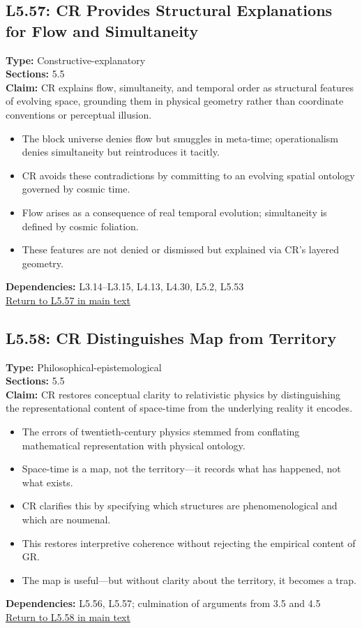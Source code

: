 \documentclass[12pt]{book}
\newcommand{\returnlink}[1]{\hyperref[logic:#1]{Return to #1 in main text}\xspace}
\begin{document}
\subsection*{L5.57: CR Provides Structural Explanations for Flow and Simultaneity}
\label{appendix:L5.57}
\textbf{Type:} Constructive-explanatory \\
\textbf{Sections:} 5.5 \\
\textbf{Claim:} CR explains flow, simultaneity, and temporal order as structural features of evolving space, grounding them in physical geometry rather than coordinate conventions or perceptual illusion.
\begin{itemize}
  \item The block universe denies flow but smuggles in meta-time; operationalism denies simultaneity but reintroduces it tacitly.
  \item CR avoids these contradictions by committing to an evolving spatial ontology governed by cosmic time.
  \item Flow arises as a consequence of real temporal evolution; simultaneity is defined by cosmic foliation.
  \item These features are not denied or dismissed but explained via CR's layered geometry.
\end{itemize}
\textbf{Dependencies:} L3.14–L3.15, L4.13, L4.30, L5.2, L5.53 \\
\returnlink{L5.57}

\subsection*{L5.58: CR Distinguishes Map from Territory}
\label{appendix:L5.58}
\textbf{Type:} Philosophical-epistemological \\
\textbf{Sections:} 5.5 \\
\textbf{Claim:} CR restores conceptual clarity to relativistic physics by distinguishing the representational content of space-time from the underlying reality it encodes.
\begin{itemize}
  \item The errors of twentieth-century physics stemmed from conflating mathematical representation with physical ontology.
  \item Space-time is a map, not the territory---it records what has happened, not what exists.
  \item CR clarifies this by specifying which structures are phenomenological and which are noumenal.
  \item This restores interpretive coherence without rejecting the empirical content of GR.
  \item The map is useful---but without clarity about the territory, it becomes a trap.
\end{itemize}
\textbf{Dependencies:} L5.56, L5.57; culmination of arguments from 3.5 and 4.5 \\
\returnlink{L5.58}
\end{document}
